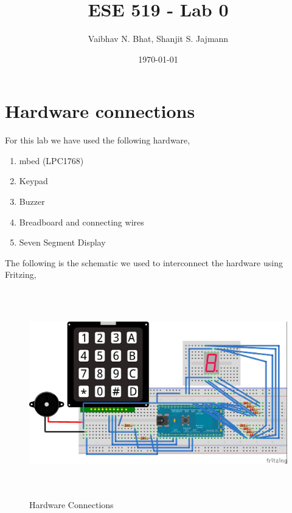 \documentclass[a4paper]{article}
\title{ESE 519 - Lab 0}
\author{Vaibhav N. Bhat, Shanjit S. Jajmann}
\date{\today}
\begin{document}


\maketitle

\section*{Hardware connections}
For this lab we have used the following hardware, 
\begin{enumerate}
\item mbed (LPC1768)
\item Keypad 
\item Buzzer 
\item Breadboard and connecting wires
\item Seven Segment Display
\end{enumerate}

The following is the schematic we used to interconnect the hardware using Fritzing,
\begin{figure}[H]
\centerline{\includegraphics[width=15cm, height=9cm]{fritzing.jpg}}
\caption{\label{fig:hw}Hardware Connections}
\end{figure}
\end{document}
